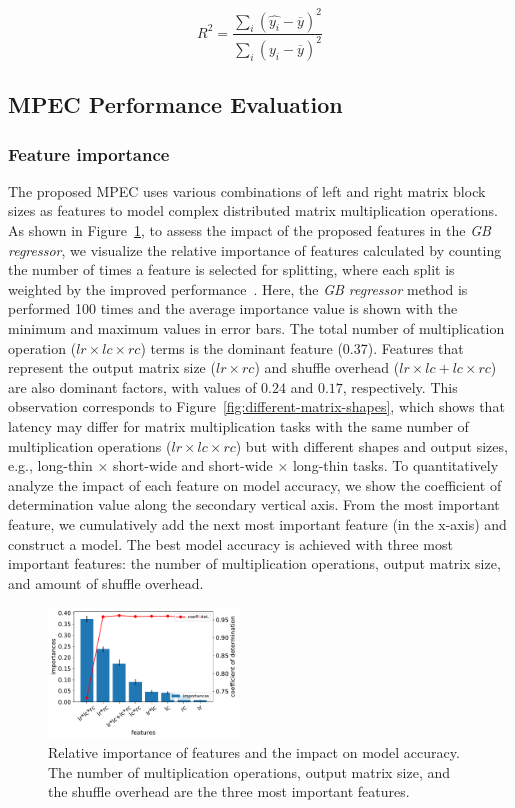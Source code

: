 \documentclass[10pt, conference, compsocconf]{IEEEtran}
\begin{document}
\begin{equation}\label{eq:cod}
  R^2 = \frac{\sum\limits_{i} (\hat{y_i}-\overline{y})^2}{\sum\limits_{i} (y_i-\overline{y})^2}
\end{equation}


\subsection{MPEC Performance Evaluation}
\subsubsection{Feature importance} The proposed MPEC uses various combinations of left and right matrix block sizes as features to model complex distributed matrix multiplication operations. As shown in Figure~\ref{fig:feature-importance}, to assess the impact of the proposed features in the \textit{GB regressor}, we visualize the relative importance of features calculated by counting the number of times a feature is selected for splitting, where each split is weighted by the improved performance~\cite{gb-feature-importance}. Here, the \textit{GB regressor} method is performed 100 times and the average importance value is shown with the minimum and maximum values in error bars. The total number of multiplication operation ($lr \times lc \times rc$) terms is the dominant feature (0.37). Features that represent the output matrix size ($lr \times rc$) and shuffle overhead ($lr \times lc + lc \times rc$) are also dominant factors, with values of $0.24$ and $0.17$, respectively. This observation corresponds to Figure~\ref{fig:different-matrix-shapes}, which shows that latency may differ for matrix multiplication tasks with the same number of multiplication operations ($lr \times lc \times rc$) but with different shapes and output sizes, e.g., long-thin $\times$ short-wide and short-wide $\times$ long-thin tasks. To quantitatively analyze the impact of each feature on model accuracy, we show the coefficient of determination value along the secondary vertical axis. From the most important feature, we cumulatively add the next most important feature (in the x-axis) and construct a model. The best model accuracy is achieved with three most important features: the number of multiplication operations, output matrix size, and amount of shuffle overhead.

\begin{figure}
  \centering\includegraphics[width=0.45\textwidth]{figures/feature-importance.pdf}\caption{Relative importance of features and the impact on model accuracy. The number of multiplication operations, output matrix size, and  the shuffle overhead are the three most important features.}\label{fig:feature-importance}
\end{figure}
\end{document}
